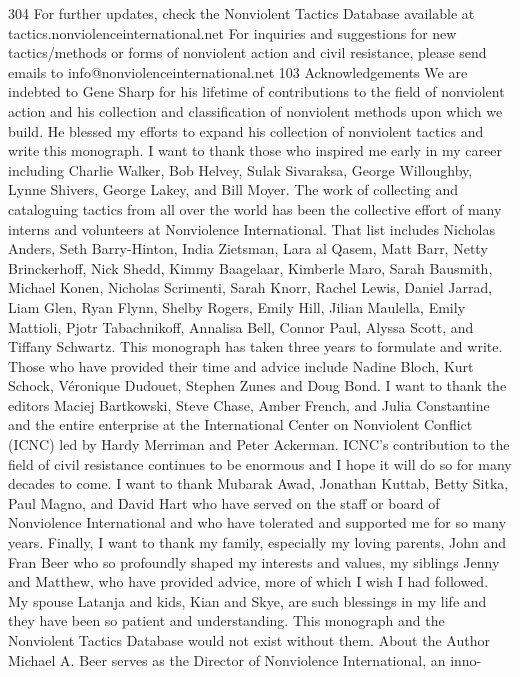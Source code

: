 \documentclass[twoside,a4paper,12pt,fleqn,openany]{extbook}
\begin{document}
 304
For further updates, check the Nonviolent Tactics Database available at
tactics.nonviolenceinternational.net
For inquiries and suggestions for new tactics/methods or forms of nonviolent action
and civil resistance, please send emails to info@nonviolenceinternational.net
103
Acknowledgements
We are indebted to Gene Sharp for his lifetime of contributions to the field of nonviolent action and his
collection and classification of nonviolent methods upon which we build. He blessed my efforts to expand
his collection of nonviolent tactics and write this monograph.
I want to thank those who inspired me early in my career including Charlie Walker, Bob Helvey, Sulak Sivaraksa,
George Willoughby, Lynne Shivers, George Lakey, and Bill Moyer.
The work of collecting and cataloguing tactics from all over the world has been the collective effort of many
interns and volunteers at Nonviolence International.
That list includes Nicholas Anders, Seth Barry-Hinton, India Zietsman, Lara al Qasem, Matt Barr, Netty Brinckerhoff,
Nick Shedd, Kimmy Baagelaar, Kimberle Maro, Sarah Bausmith, Michael Konen, Nicholas Scrimenti, Sarah Knorr,
Rachel Lewis, Daniel Jarrad, Liam Glen, Ryan Flynn, Shelby Rogers, Emily Hill, Jilian Maulella, Emily Mattioli, Pjotr
Tabachnikoff, Annalisa Bell, Connor Paul, Alyssa Scott, and Tiffany Schwartz.
This monograph has taken three years to formulate and write. Those who have provided their time and advice
include Nadine Bloch, Kurt Schock, Véronique Dudouet, Stephen Zunes and Doug Bond.
I want to thank the editors Maciej Bartkowski, Steve Chase, Amber French, and Julia Constantine and the entire
enterprise at the International Center on Nonviolent Conflict (ICNC) led by Hardy Merriman and Peter Ackerman.
ICNC’s contribution to the field of civil resistance continues to be enormous and I hope it will do so for many
decades to come.
I want to thank Mubarak Awad, Jonathan Kuttab, Betty Sitka, Paul Magno, and David Hart who have served on
the staff or board of Nonviolence International and who have tolerated and supported me for so many years.
Finally, I want to thank my family, especially my loving parents, John and Fran Beer who so profoundly shaped
my interests and values, my siblings Jenny and Matthew, who have provided advice, more of which I wish I had
followed. My spouse Latanja and kids, Kian and Skye, are such blessings in my life and they have been so
patient and understanding. This monograph and the Nonviolent Tactics Database would not exist without them.
About the Author
Michael A. Beer serves as the Director of Nonviolence International, an inno-
\end{document}
